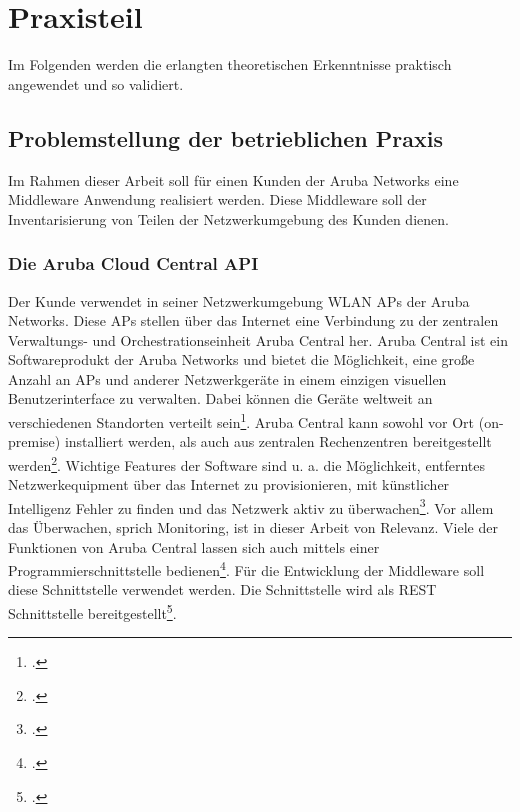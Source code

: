\chapter{Praxisteil}\label{chapter:praxisteil}

Im Folgenden werden die erlangten theoretischen Erkenntnisse praktisch angewendet und so validiert.

\section{Problemstellung der betrieblichen Praxis}\label{section:problemstellung-der-betrieblichen-praxis}

Im Rahmen dieser Arbeit soll für einen Kunden der Aruba Networks eine Middleware Anwendung realisiert werden. Diese Middleware soll der Inventarisierung von Teilen der Netzwerkumgebung des Kunden dienen. 

\subsection{Die Aruba Cloud Central API}\label{subsection:die-aruba-cloud-central-api}

Der Kunde verwendet in seiner Netzwerkumgebung WLAN APs der Aruba Networks. Diese APs stellen über das Internet eine Verbindung zu der zentralen Verwaltungs- und Orchestrationseinheit Aruba Central her. Aruba Central ist ein Softwareprodukt der Aruba Networks und bietet die Möglichkeit, eine große Anzahl an APs und anderer Netzwerkgeräte in einem einzigen visuellen Benutzerinterface zu verwalten. Dabei können die Geräte weltweit an verschiedenen Standorten verteilt sein\footcite[S. 1]{hewlett_packard_enterprise_development_lp_aruba_2021-2}. Aruba Central kann sowohl vor Ort (on-premise) installiert werden, als auch aus zentralen Rechenzentren bereitgestellt werden\footcite[S. 6]{hewlett_packard_enterprise_development_lp_aruba_2021-2}. Wichtige Features der Software sind u. a. die Möglichkeit, entferntes Netzwerkequipment über das Internet  zu provisionieren, mit künstlicher Intelligenz Fehler zu finden und das Netzwerk aktiv zu überwachen\footcite[S. 1]{hewlett_packard_enterprise_development_lp_aruba_2021-2}. Vor allem das Überwachen, sprich Monitoring, ist in dieser Arbeit von Relevanz. Viele der Funktionen von Aruba Central lassen sich auch mittels einer Programmierschnittstelle bedienen\footcite[S. 6]{hewlett_packard_enterprise_development_lp_aruba_2021-2}. Für die Entwicklung der Middleware soll diese Schnittstelle verwendet werden. Die Schnittstelle wird als REST Schnittstelle bereitgestellt\footcite[S. 6]{hewlett_packard_enterprise_development_lp_aruba_2021-2}.

